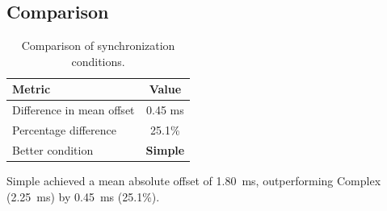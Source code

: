 \subsection*{Comparison}

\begin{table}[h!]
\centering
\begin{tabular}{|l|c|}
\hline
Metric & Value \\
\hline
Difference in mean offset & 0.45 ms \\
Percentage difference & 25.1\% \\
Better condition & \textbf{Simple} \\
\hline
\end{tabular}
\caption{Comparison of synchronization conditions.}
\label{tab:sync_comparison}
\end{table}

Simple achieved a mean absolute offset of 1.80~ms, outperforming Complex (2.25~ms) by 0.45~ms (25.1\%).
